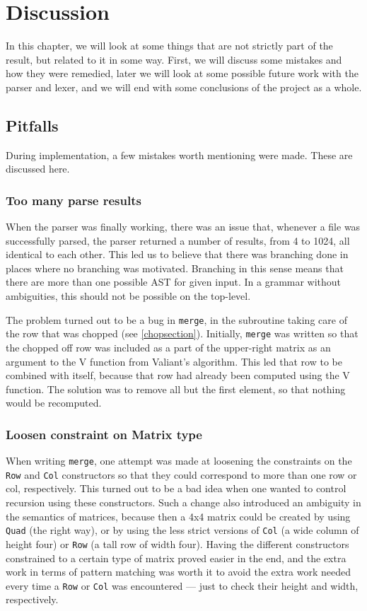 \documentclass[a4paper,12pt,notitlepage]{report}
\begin{document}
%
%
\chapter{Discussion}
In this chapter, we will look at some things that are not strictly part of the
result, but related to it in some way. First, we will discuss some mistakes and
how they were remedied, later we will look at some possible future work with the
parser and lexer, and we will end with some conclusions of the project as a
whole.

\section{Pitfalls}
During implementation, a few mistakes worth mentioning were made. These
are discussed here. 

\subsection{Too many parse results}
When the parser was finally working, there was an issue that, whenever a file
was successfully parsed, the parser returned a number of results, from 4 to
1024, all identical to each other. This led us to believe that there was
branching done in places where no branching was motivated. Branching in this
sense means that there are more than one possible AST for given input. In a
grammar without ambiguities, this should not be possible on the top-level.

The problem turned out to be a bug in \texttt{merge}, in the subroutine taking
care of the row that was chopped (see \ref{chopsection}). Initially,
\texttt{merge} was written so that the chopped off row was included as a part of
the upper-right matrix as an argument to the V function from Valiant's
algorithm. This led that row to be combined with itself, because that row had
already been computed using the V function. The solution was to remove all but
the first element, so that nothing would be recomputed.

\subsection{Loosen constraint on Matrix type}
When writing \texttt{merge}, one attempt was made at loosening the constraints
on the \texttt{Row} and \texttt{Col} constructors so that they could correspond
to more than one row or col, respectively. This turned out to be a bad idea when
one wanted to control recursion using these constructors. Such a change also
introduced an ambiguity in the semantics of matrices, because then a 4x4 matrix
could be created by using \texttt{Quad} (the right way), or by using the less
strict versions of \texttt{Col} (a wide column of height four) or \texttt{Row}
(a tall row of width four). Having the different constructors constrained to a
certain type of matrix proved easier in the end, and the extra work in terms of
pattern matching was worth it to avoid the extra work needed every time a
\texttt{Row} or \texttt{Col} was encountered --- just to check their height and
width, respectively.  
\end{document}
